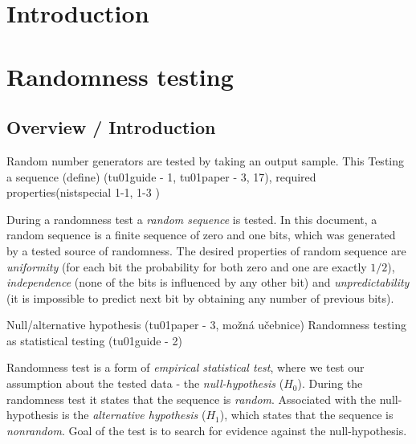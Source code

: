 \documentclass[
  digital,     %
  oneside,     %
  nosansbold,  %
  nocolorbold, %
  nolof,         %
  nolot,         %
]{fithesis4}
\begin{document}
\chapter*{Introduction}


\chapter{Randomness testing}

\section{Overview / Introduction}

Random number generators are tested by taking an output sample. This 
Testing a sequence (define) (tu01guide - 1, tu01paper - 3, 17), required properties(nistspecial 1-1, 1-3 )


During a randomness test a \emph{random sequence} is tested. In this document, a random sequence is a finite sequence of zero and one bits, which was generated by a tested source of randomness. The desired properties of random sequence are \emph{uniformity} (for each bit the probability for both zero and one are exactly $1/2$), \emph{independence} (none of the bits is influenced by any other bit) and \emph{unpredictability} (it is impossible to predict next bit by obtaining any number of previous bits). \cite[p. 1-1]{nist_special}

Null/alternative hypothesis (tu01paper - 3, možná učebnice)
Randomness testing as statistical testing (tu01guide - 2)

Randomness test is a form of \emph{empirical statistical test}, where we test our assumption about the tested data - the \emph{null-hypothesis} ($H_0$). During the randomness test it states that the sequence is \emph{random}. Associated with the null-hypothesis is the \emph{alternative hypothesis} ($H_1$), which states that the sequence is \emph{nonrandom}. Goal of the test is to search for evidence against the null-hypothesis. \cite[p. 2]{tu01_guide}
\end{document}
